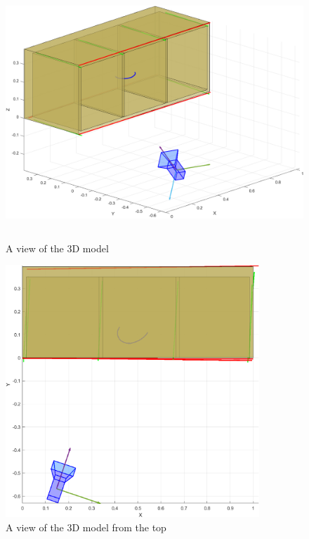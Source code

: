 \begin{figure}[H]
\centering
\includegraphics[height=9.5cm, width=\textwidth, keepaspectratio]{Report/Images/3dModel/3D_model_1.png}
\caption{\label{fig:3D model 1}A view of the 3D model}
\end{figure}

\begin{figure}[H]
\centering
\includegraphics[height=9.5cm, width=\textwidth, keepaspectratio]{Report/Images/3dModel/3D_model_2.png}
\caption{\label{fig:3D model 2}A view of the 3D model from the top}
\end{figure}

